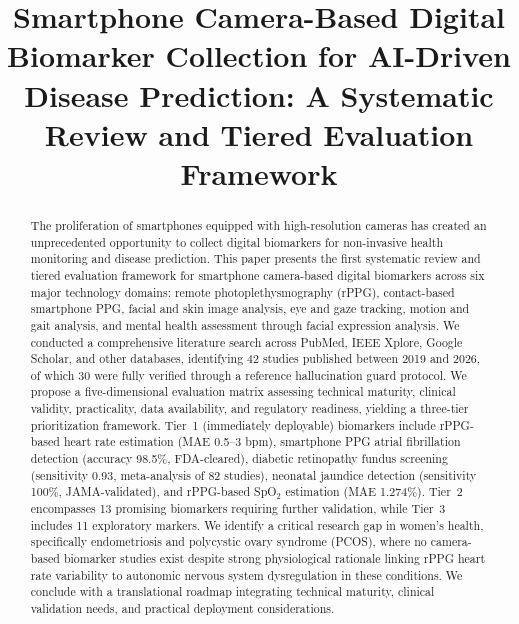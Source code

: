 \documentclass[conference]{IEEEtran}
\begin{document}
\title{Smartphone Camera-Based Digital Biomarker Collection for AI-Driven Disease Prediction: A Systematic Review and Tiered Evaluation Framework}

\author{
}

\maketitle

\begin{abstract}
The proliferation of smartphones equipped with high-resolution cameras has created an unprecedented opportunity to collect digital biomarkers for non-invasive health monitoring and disease prediction. This paper presents the first systematic review and tiered evaluation framework for smartphone camera-based digital biomarkers across six major technology domains: remote photoplethysmography (rPPG), contact-based smartphone PPG, facial and skin image analysis, eye and gaze tracking, motion and gait analysis, and mental health assessment through facial expression analysis. We conducted a comprehensive literature search across PubMed, IEEE Xplore, Google Scholar, and other databases, identifying 42 studies published between 2019 and 2026, of which 30 were fully verified through a reference hallucination guard protocol. We propose a five-dimensional evaluation matrix assessing technical maturity, clinical validity, practicality, data availability, and regulatory readiness, yielding a three-tier prioritization framework. Tier~1 (immediately deployable) biomarkers include rPPG-based heart rate estimation (MAE 0.5--3 bpm), smartphone PPG atrial fibrillation detection (accuracy 98.5\%, FDA-cleared), diabetic retinopathy fundus screening (sensitivity 0.93, meta-analysis of 82 studies), neonatal jaundice detection (sensitivity 100\%, JAMA-validated), and rPPG-based SpO$_2$ estimation (MAE 1.274\%). Tier~2 encompasses 13 promising biomarkers requiring further validation, while Tier~3 includes 11 exploratory markers. We identify a critical research gap in women's health, specifically endometriosis and polycystic ovary syndrome (PCOS), where no camera-based biomarker studies exist despite strong physiological rationale linking rPPG heart rate variability to autonomic nervous system dysregulation in these conditions. We conclude with a translational roadmap integrating technical maturity, clinical validation needs, and practical deployment considerations.
\end{abstract}
\end{document}
